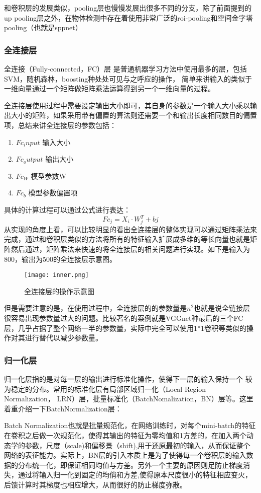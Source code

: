 和卷积层的发展类似，pooling层也慢慢发展出很多不同的分支，除了前面提到的 up pooling层之外，在物体检测中存在着使用非常广泛的roi-pooling和空间金字塔pooling（也就是sppnet）
\subsubsection{全连接层}
全连接（Fully-connected，FC）层
是普通机器学习方法中使用最多的层，包括SVM，随机森林，boosting种处处可见与之呼应的操作，
简单来讲输入的类似于一维向量通过一个矩阵做矩阵乘法运算得到另一个一维向量的过程。

全连接层使用过程中需要设定输出大小即可，其自身的参数是一个输入大小乘以输出大小的矩阵，如果采用带有偏置的算法则还需要一个和输出长度相同数目的偏置项，总结来讲全连接层的参数包括：
\begin{enumerate}
\item $Fc_input$  输入大小
\item $Fc_output$ 输出大小
\item $Fc_W$ 		  模型参数W
\item $Fc_b$ 		  模型参数偏置项
\end{enumerate}

具体的计算过程可以通过公式进行表达：
\begin{equation}{
Fc_j=X_i·W_j^T+bj
}
\end{equation}
从实现的角度上看，可以比较明显的看出全连接层的整体实现可以通过矩阵乘法来完成，通过和卷积层类似的方法将所有的特征输入扩展成多维的等长向量也就是矩阵然后通过，矩阵乘法来快速的将全连接层的相关问题进行实现。如下是输入为800，输出为500的全连接层示意图。
\begin{figure}[!ht]
 \centering
	\texttt{[image: inner.png]}
	\caption{全连接层的操作示意图}
\end{figure}

但是需要注意的是，在使用过程中，全连接层的的参数量是$n^2$也就是说全链接层很容易出现参数量过大的问题。比较著名的案例就是VGGnet种最后的三个FC层，几乎占据了整个网络一半的参数量，实际中完全可以使用1*1卷积等类似的操作对其进行替代以减少参数量。
\subsubsection{归一化层}
归一化层指的是对每一层的输出进行标准化操作，使得下一层的输入保持一个 较为稳定的分布。常用的标准化层有局部区域归一化（Local Region Normalization， LRN）层，批量标准化（BatchNomalization，BN）层等。这里着重介绍一下BatchNormalization层：

Batch Normalization也就是批量规范化，在网络训练时，对每个mini-batch的特征在卷积之后做一次规范化，使得其输出的特征为零均值和1方差的，在加入两个动态学的参数，尺度（scale)和偏移景（shift),用于还原最初的输入，从而保证整个网络的表征能力。实际上，BN层的引入本质上是为了使得每一个卷积层的输入数据的分布统一化，即保证相同均值与方差。另外一个主要的原因则足防止梯度消失，通过将输入归一化到固定的均俏和方差,使得原本尺度很小的特征相应变火，后馈计算时其梯度也相应增大，从而很好的防止梯度弥散。

